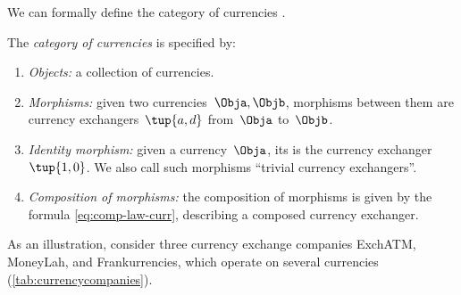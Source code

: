 We can formally define the category of currencies \Curr.

\begin{definition}
    \label{def:Curr}
    The \emph{category of currencies} \Curr is specified by:
    \begin{enumerate}
        \item \emph{Objects:} a collection of currencies.
        \item \emph{Morphisms:} given two currencies~$\Obja, \Objb$, morphisms between them are currency exchangers~$\tup{a,d}$ from~$\Obja$ to~$\Objb$.
        \item \emph{Identity morphism:} given a currency~$\Obja$, its  is the currency exchanger~$\tup{1,0}$.
              We also call such morphisms ``trivial currency exchangers''.
        \item \emph{Composition of morphisms:} the composition of morphisms is given by the formula \cref{eq:comp-law-curr}, describing a composed currency exchanger.
    \end{enumerate}
\end{definition}

As an illustration, consider three currency exchange companies ExchATM, MoneyLah, and Frankurrencies, which operate on several currencies (\cref{tab:currencycompanies}).

